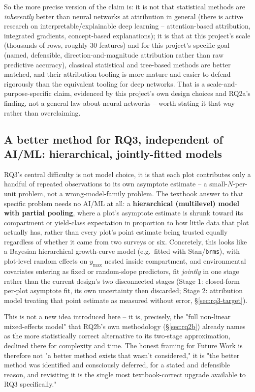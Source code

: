 So the more precise version of the claim is: it is not that statistical methods are
\emph{inherently} better than neural networks at attribution in general (there is active research
on interpretable/explainable deep learning -- attention-based attribution, integrated gradients,
concept-based explanations); it is that at this project's scale (thousands of rows, roughly 30
features) and for this project's specific goal (named, defensible, direction-and-magnitude
attribution rather than raw predictive accuracy), classical statistical and tree-based methods are
better matched, and their attribution tooling is more mature and easier to defend rigorously than
the equivalent tooling for deep networks. That is a scale-and-purpose-specific claim, evidenced by
this project's own design choices and RQ2a's finding, not a general law about neural networks --
worth stating it that way rather than overclaiming.

\subsection{A better method for RQ3, independent of AI/ML: hierarchical, jointly-fitted models}
\label{sec:futurework-hierarchical}

RQ3's central difficulty is not model choice, it is that each plot contributes only a handful of
repeated observations to its own asymptote estimate -- a small-$N$-per-unit problem, not a
wrong-model-family problem. The textbook answer to that specific problem needs no AI/ML at all: a
\textbf{hierarchical (multilevel) model with partial pooling}, where a plot's asymptote estimate is
shrunk toward its compartment or yield-class expectation in proportion to how little data that
plot actually has, rather than every plot's point estimate being trusted equally regardless of
whether it came from two surveys or six. Concretely, this looks like a Bayesian hierarchical
growth-curve model (e.g.\ fitted with Stan/\texttt{brms}), with plot-level random effects on
$y_{\max}$ nested inside compartment, and environmental covariates entering as fixed or
random-slope predictors, fit \emph{jointly} in one stage rather than the current design's two
disconnected stages (Stage 1: closed-form per-plot asymptote fit, its own uncertainty then
discarded; Stage 2: attribution model treating that point estimate as measured without error,
\S\ref{sec:rq3-target}).

This is not a new idea introduced here -- it is, precisely, the "full non-linear mixed-effects
model" that RQ2b's own methodology (\S\ref{sec:rq2b}) already names as the more statistically
correct alternative to its two-stage approximation, declined there for complexity and time. The
honest framing for Future Work is therefore not "a better method exists that wasn't considered," it
is "the better method was identified and consciously deferred, for a stated and defensible reason,
and revisiting it is the single most textbook-correct upgrade available to RQ3 specifically."

